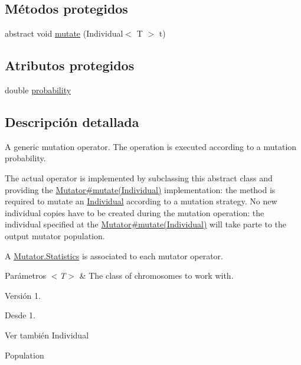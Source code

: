 \subsection*{Métodos protegidos}
\begin{DoxyCompactItemize}
\item 
abstract void \hyperlink{classjenes_1_1stage_1_1operator_1_1_mutator_3_01_t_01extends_01_chromosome_01_4_a5ea1c6fd8d4ed580d70e1fafd85bb3a8}{mutate} (Individual$<$ T $>$ t)
\end{DoxyCompactItemize}
\subsection*{Atributos protegidos}
\begin{DoxyCompactItemize}
\item 
double \hyperlink{classjenes_1_1stage_1_1operator_1_1_mutator_3_01_t_01extends_01_chromosome_01_4_a60f38eb7afd1ad6a7d1c0c639df2d5fe}{probability}
\end{DoxyCompactItemize}


\subsection{Descripción detallada}
A generic mutation operator. The operation is executed according to a mutation probability. 

The actual operator is implemented by subclassing this abstract class and providing the \hyperlink{}{Mutator\#mutate(\-Individual)} implementation\-: the method is required to mutate an \hyperlink{}{Individual} according to a mutation strategy. No new individual copies have to be created during the mutation operation\-: the individual specified at the \hyperlink{}{Mutator\#mutate(\-Individual)} will take parte to the output mutator population. 

A \hyperlink{}{Mutator.\-Statistics} is associated to each mutator operator.


\begin{DoxyParams}{Parámetros}
{\em $<$\-T$>$} & The class of chromosomes to work with.\\
\hline
\end{DoxyParams}
\begin{DoxyVersion}{Versión}
1. 
\end{DoxyVersion}
\begin{DoxySince}{Desde}
1.
\end{DoxySince}
\begin{DoxySeeAlso}{Ver también}
Individual 

Population 
\end{DoxySeeAlso}


